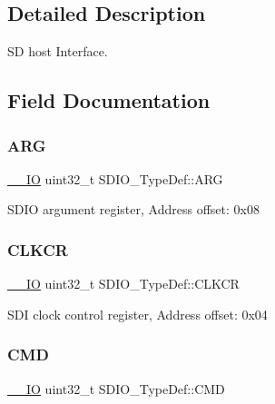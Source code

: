 \subsection{Detailed Description}
SD host Interface. 

\subsection{Field Documentation}
\mbox{\label{struct_s_d_i_o___type_def_a3e24392875e98cd09043e54a0990ab7a}} 
\subsubsection{\texorpdfstring{A\+RG}{ARG}}
{\footnotesize\ttfamily \hyperlink{core__sc300_8h_aec43007d9998a0a0e01faede4133d6be}{\+\_\+\+\_\+\+IO} uint32\+\_\+t S\+D\+I\+O\+\_\+\+Type\+Def\+::\+A\+RG}

S\+D\+IO argument register, Address offset\+: 0x08 \mbox{\label{struct_s_d_i_o___type_def_aeb1e30ce2038628e45264f75e5e926bb}} 
\subsubsection{\texorpdfstring{C\+L\+K\+CR}{CLKCR}}
{\footnotesize\ttfamily \hyperlink{core__sc300_8h_aec43007d9998a0a0e01faede4133d6be}{\+\_\+\+\_\+\+IO} uint32\+\_\+t S\+D\+I\+O\+\_\+\+Type\+Def\+::\+C\+L\+K\+CR}

S\+DI clock control register, Address offset\+: 0x04 \mbox{\label{struct_s_d_i_o___type_def_abbbdc3174e12dab21123d746d65f345d}} 
\subsubsection{\texorpdfstring{C\+MD}{CMD}}
{\footnotesize\ttfamily \hyperlink{core__sc300_8h_aec43007d9998a0a0e01faede4133d6be}{\+\_\+\+\_\+\+IO} uint32\+\_\+t S\+D\+I\+O\+\_\+\+Type\+Def\+::\+C\+MD}


